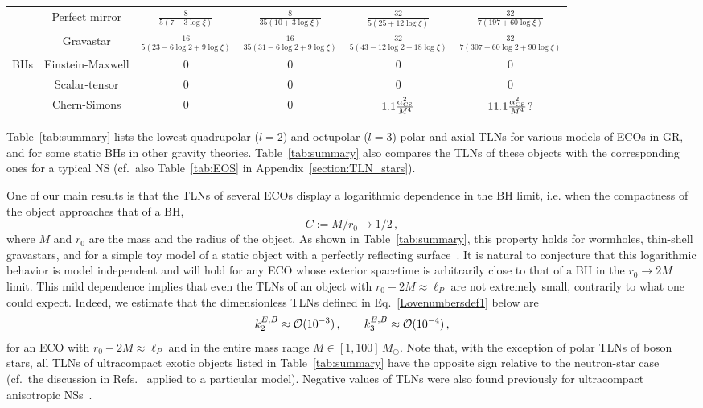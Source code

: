 \documentclass[aps,twocolumn,showpacs,preprintnumbers,nofootinbib,prd,superscriptaddress,groupedaddress,10pt]{revtex4-1}
\def\be{\begin{equation}}
\def\ee{\end{equation}}
\begin{document}
\begin{table*}[ht!]
\begin{tabular}{|c|c|cccc|}
                                       & Perfect mirror    & $\frac{8}{5 (7+3 \log\xi)}$         	 & $\frac{8}{35 (10+3 \log\xi)}$          & $\frac{32}{5 (25+12 \log\xi)}$          & $\frac{32}{7 (197+60 \log\xi)}$ \\
                                       & Gravastar         &  $\frac{16}{5 (23-6\log{2}+9 \log\xi)}$         	 &  $\frac{16}{35 (31-6 \log{2}+9 \log\xi)}$       &  $\frac{32}{5 (43-12\log{2}+18\log\xi)}$        &   $\frac{32}{7 (307-60 \log{2}+90 \log\xi)}$      \\
                                       \hline
\multirow{4}{*}{BHs} & Einstein-Maxwell &  $0$      	 & $0$     & $0$     & $0$     \\
                                       & Scalar-tensor    &  $0$      	 & $0$     & $0$     & $0$     \\
                                       & Chern-Simons     &  $0$      	 & $0$        &   $1.1\frac{\alpha^2_{\rm CS}}{M^4}$      &  $11.1\frac{\alpha^2_{\rm CS}}{M^4}$?       \\
\hline
\hline
\end{tabular}    
\end{table*}
%
Table~\ref{tab:summary} lists the lowest quadrupolar ($l=2$) and octupolar ($l=3$) polar and axial TLNs for various models of ECOs in GR,
and for some static BHs in other gravity theories.
%
Table~\ref{tab:summary} also compares the TLNs of these objects with the corresponding ones for a typical NS (cf.\ also Table~\ref{tab:EOS} in Appendix~\ref{section:TLN_stars}).
%


One of our main results is that the TLNs of several ECOs display a logarithmic dependence in the BH limit, i.e. when the compactness of the object approaches that of a BH,
%
\be
C:=M/r_0\to 1/2\,,
\ee
% 
where $M$ and $r_0$ are the mass and the radius of the object. As shown in Table~\ref{tab:summary}, this property holds for wormholes, thin-shell gravastars, and for a simple toy model of a static object with a perfectly reflecting surface~\cite{Saravani:2012is,Abedi:2016hgu}.
%
It is natural to conjecture that this logarithmic behavior is model independent and will hold for any ECO whose exterior spacetime is arbitrarily close to that of a BH in the $r_0\to 2M$ limit. This mild dependence implies that even the TLNs of an object with $r_0-2M\approx \ell_P$ are not extremely small, contrarily to what one could expect. Indeed, we estimate that the dimensionless TLNs defined in Eq.~\eqref{Lovenumbersdef1} below are 
\begin{equation}
 k_2^{E,B}\approx {\cal O}(10^{-3})\,, \qquad k_3^{E,B}\approx {\cal O}(10^{-4})\,, \label{estimates}
\end{equation}
%
for an ECO with $r_0-2M\approx \ell_P$ and in the entire mass range $M\in [1,100]\, M_\odot$. Note that, with the exception of polar TLNs of boson stars, all TLNs of ultracompact exotic objects listed in Table~\ref{tab:summary} have the opposite sign relative to the neutron-star case (cf.\ the discussion in Refs.~\cite{Pani:2015tga,Uchikata:2016qku} applied to a particular model). Negative values of TLNs were also found previously for ultracompact anisotropic NSs~\cite{Yagi:2016ejg}.   
\end{document}
